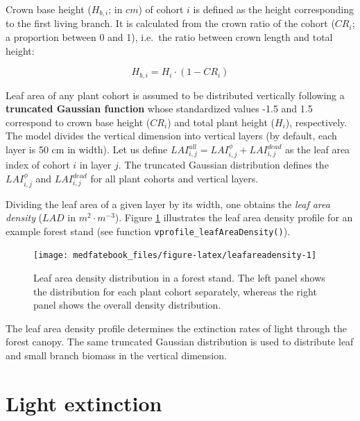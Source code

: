 \documentclass[]{book}
\begin{document}
Crown base height (\(H_{b,i}\); in \(cm\)) of cohort \(i\) is defined as
the height corresponding to the first living branch. It is calculated
from the crown ratio of the cohort (\(CR_i\); a proportion between 0 and
1), i.e.~the ratio between crown length and total height:

\begin{equation}
H_{b,i} = H_{i} \cdot (1 - CR_i)
\label{eq:CrownHeight}
\end{equation}

Leaf area of any plant cohort is assumed to be distributed vertically
following a \textbf{truncated Gaussian function} whose standardized
values -1.5 and 1.5 correspond to crown base height (\(CR_i\)) and total
plant height (\(H_i\)), respectively. The model divides the vertical
dimension into vertical layers (by default, each layer is 50 cm in
width). Let us define
\(LAI_{i,j}^{all} = LAI_{i,j}^{\phi}+LAI_{i,j}^{dead}\) as the leaf area
index of cohort \(i\) in layer \(j\). The truncated Gaussian
distribution defines the \(LAI_{i,j}^{\phi}\) and \(LAI_{i,j}^{dead}\)
for all plant cohorts and vertical layers.

Dividing the leaf area of a given layer by its width, one obtains the
\emph{leaf area density} (\(LAD\) in \(m^2 \cdot m^{-3}\)). Figure
\ref{fig:leafareadensity} illustrates the leaf area density profile for
an example forest stand (see function
\texttt{vprofile\_leafAreaDensity()}).

\begin{figure}

{\centering \texttt{[image: medfatebook\_files/figure-latex/leafareadensity-1]} 

}

\caption{Leaf area density distribution in a forest stand. The left panel shows the distribution for each plant cohort separately, whereas the right panel shows the overall density distribution.}\label{fig:leafareadensity}
\end{figure}

The leaf area density profile determines the extinction rates of light
through the forest canopy. The same truncated Gaussian distribution is
used to distribute leaf and small branch biomass in the vertical
dimension.

\section{Light extinction}\label{basiclightextinction}
\end{document}
